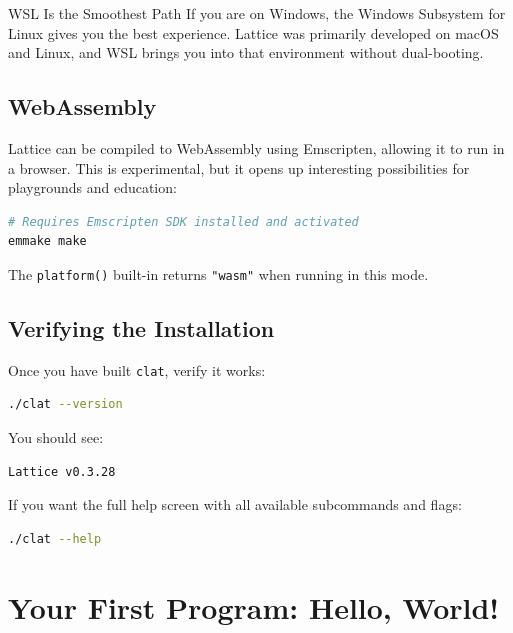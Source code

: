 \begin{tipbox}{WSL Is the Smoothest Path}
If you are on Windows, the Windows Subsystem for Linux gives you the best experience.
Lattice was primarily developed on macOS and Linux, and WSL brings you into that environment without dual-booting.
\end{tipbox}

\subsection{WebAssembly}\label{subsec:install-wasm}

Lattice can be compiled to WebAssembly using Emscripten, allowing it to run in a browser.
This is experimental, but it opens up interesting possibilities for playgrounds and education:

\begin{lstlisting}[language=bash, numbers=none]
# Requires Emscripten SDK installed and activated
emmake make
\end{lstlisting}

The \lstinline|platform()| built-in returns \lstinline|"wasm"| when running in this mode.

\subsection{Verifying the Installation}\label{subsec:verify-install}

Once you have built \texttt{clat}, verify it works:

\begin{lstlisting}[language=bash, numbers=none]
./clat --version
\end{lstlisting}

You should see:

\begin{lstlisting}[language=bash, numbers=none]
Lattice v0.3.28
\end{lstlisting}

If you want the full help screen with all available subcommands and flags:

\begin{lstlisting}[language=bash, numbers=none]
./clat --help
\end{lstlisting}

\section{Your First Program: Hello, World!}\label{sec:hello-world}

